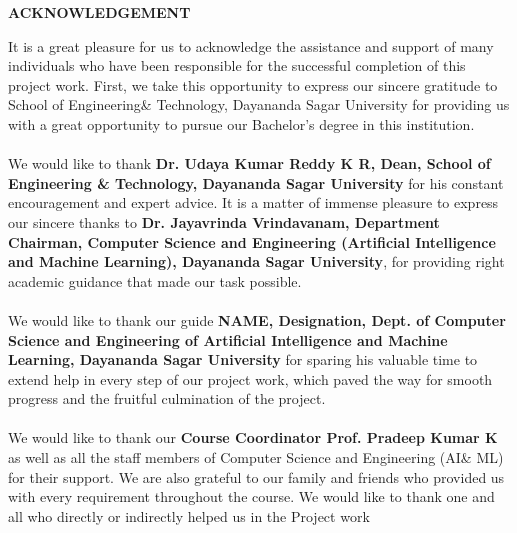 \documentclass[ 12pt,a4paper,twocolumn,fleqn]{report}
\begin{document}
\newpage
  \pagestyle{plain}
\thisfancypage{%
  \setlength{\fboxsep}{20pt}\doublebox}{}
\begin{center}
\huge\textbf{ACKNOWLEDGEMENT}
\end{center}
\vspace{15mm}
\normalsize
It is a great pleasure for us to acknowledge the assistance and support of many individuals who have been responsible for the successful completion of this project work.
First, we take this opportunity to express our sincere gratitude to School of Engineering\& Technology, Dayananda Sagar University for providing us with a great opportunity to pursue our Bachelor’s degree in this institution.
\\
\hfill
\\
We would like to thank \textbf{ Dr. Udaya Kumar Reddy K R, Dean, School of Engineering \&
Technology, Dayananda Sagar University }for his constant encouragement and expert advice.
It is a matter of immense pleasure to express our sincere thanks to\textbf{ Dr. Jayavrinda
Vrindavanam, Department Chairman, Computer Science and Engineering (Artificial
Intelligence and Machine Learning), Dayananda Sagar University}, for providing right academic guidance that made our task possible.
\\
\hfill
\\
We would like to thank our guide  \textbf{NAME, Designation, Dept. of
Computer Science and Engineering of Artificial Intelligence and Machine Learning, Dayananda Sagar University} for sparing his valuable time to extend help in every step of our
project work, which paved the way for smooth progress and the fruitful culmination of the project.
\\
\hfill
\\
We would like to thank our \textbf{Course Coordinator Prof. Pradeep Kumar K} as well as all the staff members
of Computer Science and Engineering (AI\& ML) for their support.
We are also grateful to our family and friends who provided us with every requirement
throughout the course.
We would like to thank one and all who directly or indirectly helped us in the Project work


\newpage
  \pagestyle{fancy}
\thisfancypage{%
  \setlength{\fboxsep}{20pt}\doublebox}{}
\tableofcontents{\protect\enlargethispage*{\baselineskip}}
\end{document}
